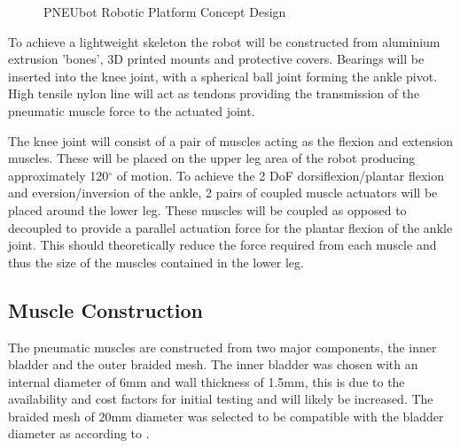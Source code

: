 \documentclass[11pt,a4paper]{article}
\begin{document}
\begin{figure}[hbt!]
    \caption{PNEUbot Robotic Platform Concept Design}
    \label{fig:platform}
\end{figure}

To achieve a lightweight skeleton the robot will be constructed from aluminium extrusion 'bones', 3D printed mounts and protective covers. Bearings will be inserted into the knee joint, with a spherical ball joint forming the ankle pivot. High tensile nylon line will act as tendons providing the transmission of the pneumatic muscle force to the actuated joint. \newline

The knee joint will consist of a pair of muscles acting as the flexion and extension muscles. These will be placed on the upper leg area of the robot producing approximately 120$^{\circ}$ of motion. To achieve the 2 DoF dorsiflexion/plantar flexion and eversion/inversion of the ankle, 2 pairs of coupled muscle actuators will be placed around the lower leg. These muscles will be coupled as opposed to decoupled to provide a parallel actuation force for the plantar flexion of the ankle joint. This should theoretically reduce the force required from each muscle and thus the size of the muscles contained in the lower leg. 

\subsection{Muscle Construction}
\label{sub:muscle_construction}

The pneumatic muscles are constructed from two major components, the inner bladder and the outer braided mesh. The inner bladder was chosen with an internal diameter of 6mm and wall thickness of 1.5mm, this is due to the availability and cost factors for initial testing and will likely be increased. The braided mesh of 20mm diameter was selected to be compatible with the bladder diameter as according to \cite{andrikopoulos_nikolakopoulos_2017}.
\end{document}
